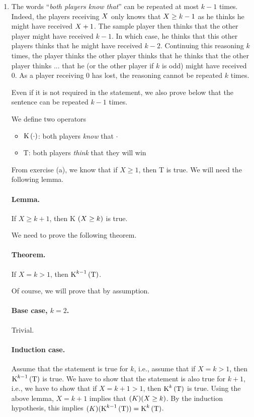 \begin{enumerate}[label=\alph*.]
  
  \item The words ``\textit{both players know that}'' can be repeated at most $k-1$ times.
    Indeed, the players receiving $X$ only knows that $X \ge k-1$ as he thinks he might have received $X + 1$.
    The sample player then thinks that the other player might have received $k - 1$.
    In which case, he thinks that this other players thinks that he might have received $k - 2$.
    Continuing this reasoning $k$ times, the player thinks the other player thinks that he thinks that the other player thinks ... that he (or the other player if $k$ is odd) might have received 0.
    As a player receiving 0 has lost, the reasoning cannot be repeated $k$ times.
    
    Even if it is not required in the statement, we also prove below that the sentence can be repeated $k - 1$ times.
  
  We define two operators
  \begin{itemize}
    \item $\text{K} \left(\cdot\right)$: both players \textit{know} that $\cdot$ 
    \item T: both players \textit{think} that they will win 
  \end{itemize}
  
  From exercise (a), we know that if $X \geq 1$, then T is true. We will need the following lemma.
  
  \paragraph{Lemma.} If $X \geq k + 1$, then K $\left(X \geq k\right)$ is true.
  
  We need to prove the following theorem.
  
  \paragraph{Theorem.} If $X = k > 1$, then $\text{K}^{k-1} \left(\text{T}\right)$.
  
  Of course, we will prove that by assumption.
  
  \paragraph{Base case, $k=2$.} Trivial.
  \paragraph{Induction case.} Assume that the statement is true for $k$,
  i.e., assume that if $X = k > 1$, then $\text{K}^{k-1} \left(\text{T}\right)$ is true.
  We have to show that the statement is also true for $k+1$, i.e., we have to show that if $X = k+1 > 1$,
  then $\text{K}^{k} \left(\text{T}\right)$ is true.
  Using the above lemma, $X = k+1$ implies that $\text(K)(X \ge k)$.
  By the induction hypothesis, this implies $\text(K)(\text{K}^{k-1} \left(\text{T}\right)) = \text{K}^{k} \left(\text{T}\right)$.
  

\end{enumerate}
